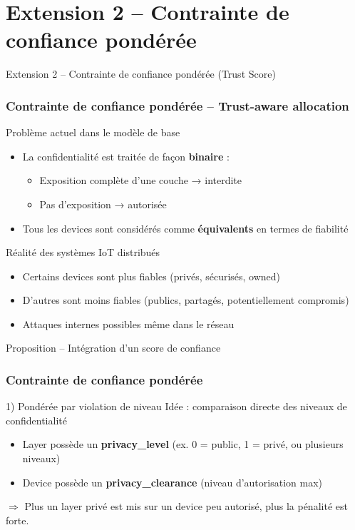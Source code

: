 \documentclass[aspectratio=169]{beamer}
\begin{document}
\section{Extension 2 – Contrainte de confiance pondérée}
\begin{frame}{Extension 2 – Contrainte de confiance pondérée (Trust Score)}
\frametitle{Contrainte de confiance pondérée – Trust-aware allocation}

\begin{block}{Problème actuel dans le modèle de base}
\begin{itemize}
    \item La confidentialité est traitée de façon \textbf{binaire} :
    \begin{itemize}
        \item Exposition complète d’une couche → interdite
        \item Pas d’exposition → autorisée
    \end{itemize}
    \item Tous les devices sont considérés comme \textbf{équivalents} en termes de fiabilité
\end{itemize}
\end{block}
\bigskip

\begin{alertblock}{Réalité des systèmes IoT distribués}
\begin{itemize}
    \item Certains devices sont plus fiables (privés, sécurisés, owned)
    \item D’autres sont moins fiables (publics, partagés, potentiellement compromis)
    \item Attaques internes possibles même dans le réseau
\end{itemize}
\end{alertblock}
\end{frame}

\begin{frame}{Proposition – Intégration d’un score de confiance}
\frametitle{Contrainte de confiance pondérée}
\begin{block}{1) Pondérée par violation de niveau}
Idée : comparaison directe des niveaux de confidentialité
\begin{itemize}
    \item Layer possède un \textbf{privacy\_level} (ex. 0 = public, 1 = privé, ou plusieurs niveaux)
    \item Device possède un \textbf{privacy\_clearance} (niveau d’autorisation max)
\end{itemize}
$\Rightarrow$ Plus un layer privé est mis sur un device peu autorisé, plus la pénalité est forte.
\end{block}
\end{frame}
\end{document}

